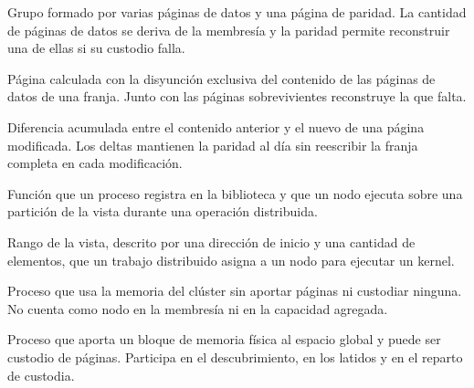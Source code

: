 \begin{description}[leftmargin=2.7cm, style=nextline, itemsep=0.35em]
\item[Franja] Grupo formado por varias páginas de datos y una página de paridad. La cantidad de páginas de datos se deriva de la membresía y la paridad permite reconstruir una de ellas si su custodio falla.

\item[Paridad] Página calculada con la disyunción exclusiva del contenido de las páginas de datos de una franja. Junto con las páginas sobrevivientes reconstruye la que falta.

\item[Delta] Diferencia acumulada entre el contenido anterior y el nuevo de una página modificada. Los deltas mantienen la paridad al día sin reescribir la franja completa en cada modificación.

\item[Kernel] Función que un proceso registra en la biblioteca y que un nodo ejecuta sobre una partición de la vista durante una operación distribuida.

\item[Partición] Rango de la vista, descrito por una dirección de inicio y una cantidad de elementos, que un trabajo distribuido asigna a un nodo para ejecutar un kernel.

\item[Cliente] Proceso que usa la memoria del clúster sin aportar páginas ni custodiar ninguna. No cuenta como nodo en la membresía ni en la capacidad agregada.

\item[Nodo] Proceso que aporta un bloque de memoria física al espacio global y puede ser custodio de páginas. Participa en el descubrimiento, en los latidos y en el reparto de custodia.

\end{description}
